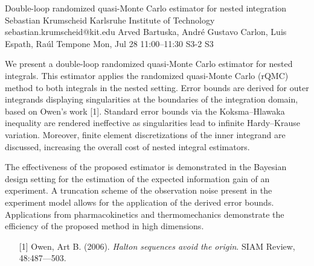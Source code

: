 \begin{talk}
  {Double-loop randomized quasi-Monte Carlo estimator for nested integration}%
  {Sebastian Krumscheid}%
  {Karlsruhe Institute of Technology}%
  {sebastian.krumscheid@kit.edu}%
  {Arved Bartuska, Andr\'{e} Gustavo Carlon, Luis Espath, Ra\'{u}l Tempone}%
  {}%
  {Mon, Jul 28 11:00–11:30}%
  {S3-2}%
  {S3}%
  
				
			
We present a double-loop randomized quasi-Monte Carlo estimator for nested integrals. This estimator applies the randomized quasi-Monte Carlo (rQMC) method to both integrals in the nested setting. Error bounds are derived for outer integrands displaying singularities at the boundaries of the integration domain, based on Owen's work [1]. Standard error bounds via the Koksma--Hlawaka inequality are rendered ineffective as singularities lead to infinite Hardy--Krause variation. Moreover, finite element discretizations of the inner integrand are discussed, increasing the overall cost of nested integral estimators. 

The effectiveness of the proposed estimator is demonstrated in the Bayesian design setting for the estimation of the expected information gain of an experiment. A truncation scheme of the observation noise present in the experiment model allows for the application of the derived error bounds. Applications from pharmacokinetics and thermomechanics demonstrate the efficiency of the proposed method in high dimensions.

\medskip

\begin{enumerate}
	\item[{[1]}] Owen, Art B. (2006). {\it Halton sequences avoid the origin}. SIAM Review, 48:487---503.
\end{enumerate}

\end{talk}

